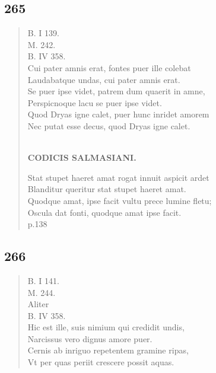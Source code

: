 \documentclass[11pt, a4paper]{report}
\begin{document}
            \subsection*{265}
      \begin{verse}
      B. I 139. \\ M. 242. \\ B. IV 358. \\ Cui pater amnis erat, fontes puer ille colebat \\ Laudabatque undas, cui pater amnis erat. \\ Se puer ipse videt, patrem dum quaerit in amne, \\ Perspicnoque lacu se puer ipse videt. \\ Quod Dryas igne calet, puer hunc inridet amorem \\ Nec putat esse decus, quod Dryas igne calet. \\ 
        ﻿\pagebreak 
    \begin{center} \textbf{CODICIS SALMASIANI.} \end{center} \marginpar{[01]} Stat stupet haeret amat rogat innuit aspicit ardet \\ Blanditur queritur stat stupet haeret amat. \\ Quodque amat, ipse facit vultu prece lumine fletu; \\ Oscula dat fonti, quodque amat ipse facit. \\ p.138 \\ 
      \end{verse}
  
            \subsection*{266}
      \begin{verse}
      B. I 141. \\ M. 244. \\  \lbrack Aliter \rbrack  \\ B. IV 358. \\ Hic est ille, suis nimium qui credidit undis, \\ Narcissus vero dignus amore puer. \\ Cernis ab inriguo repetentem gramine ripas, \\ Vt per quas periit crescere possit aquas. \\ 
      \end{verse}
  
\end{document}
